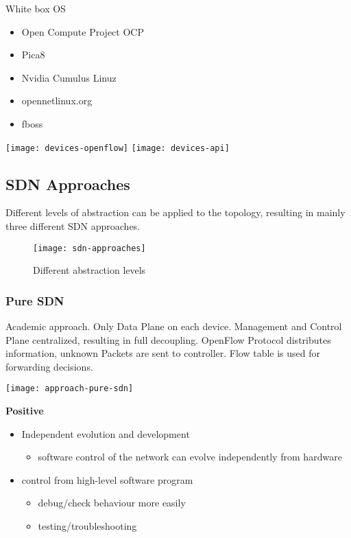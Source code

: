 \noindent
White box OS
\begin{itemize}
	\item Open Compute Project OCP
	\item Pica8
	\item Nvidia Cumulus Linuz
	\item opennetlinux.org
	\item fboss
\end{itemize}

\texttt{[image: devices-openflow]}
\texttt{[image: devices-api]}

\subsection{SDN Approaches}
Different levels of abstraction can be applied to the topology, resulting in mainly three different SDN approaches. 

\begin{figure}
	\centering
	\caption{Different abstraction levels}
	\texttt{[image: sdn-approaches]}
\end{figure}

\subsubsection{Pure SDN}
Academic approach.
Only Data Plane on each device. 
Management and Control Plane centralized, resulting in full decoupling. 
OpenFlow Protocol distributes information, unknown Packets are sent to controller. 
Flow table is used for forwarding decisions. 

\texttt{[image: approach-pure-sdn]}

\noindent
\textbf{Positive}
\begin{itemize}
	\item Independent evolution and development 
	\begin{itemize}\item software control of the network can evolve independently from hardware \end{itemize}
	\item control from high-level software program 
	\begin{itemize}\item debug/check behaviour more easily 
	\item testing/troubleshooting\end{itemize} 
\end{itemize}

